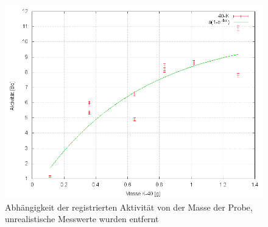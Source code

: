 \begin{figure}
 \centering \includegraphics[width = 0.99\linewidth]{Messwerte/plots/K40_massenabh_bereinigt.png}
 \caption{Abhängigkeit der registrierten Aktivität von der Masse der Probe, unrealistische Messwerte wurden entfernt}
\end{figure}

